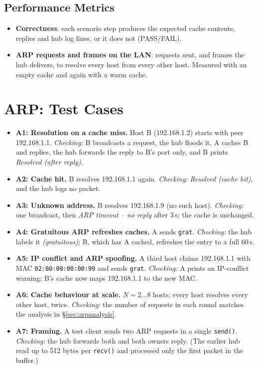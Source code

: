 \documentclass[11pt]{article}
\begin{document}
\subsection{Performance Metrics}
\begin{itemize}[leftmargin=1.6em]
  \item \textbf{Correctness}: each scenario step produces the expected cache contents,
  replies and hub log lines, or it does not (PASS/FAIL).
  \item \textbf{ARP requests and frames on the LAN}: requests sent, and frames the hub
  delivers, to resolve every host from every other host. Measured with an empty cache and
  again with a warm cache.
\end{itemize}


\section{ARP: Test Cases}

\begin{itemize}[leftmargin=1.6em]
  \item \textbf{A1: Resolution on a cache miss.} Host B (192.168.1.2) starts with peer
  192.168.1.1. \emph{Checking:} B broadcasts a request, the hub floods it, A caches B and
  replies, the hub forwards the reply to B's port only, and B prints
  \emph{Resolved (after reply)}.
  \item \textbf{A2: Cache hit.} B resolves 192.168.1.1 again. \emph{Checking:}
  \emph{Resolved (cache hit)}, and the hub logs no packet.
  \item \textbf{A3: Unknown address.} B resolves 192.168.1.9 (no such host).
  \emph{Checking:} one broadcast, then \emph{ARP timeout -- no reply} after 3\,s; the
  cache is unchanged.
  \item \textbf{A4: Gratuitous ARP refreshes caches.} A sends \texttt{grat}.
  \emph{Checking:} the hub labels it \emph{(gratuitous)}; B, which has A cached,
  refreshes the entry to a full 60\,s.
  \item \textbf{A5: IP conflict and ARP spoofing.} A third host claims 192.168.1.1 with MAC
  \texttt{02:00:00:00:00:99} and sends \texttt{grat}. \emph{Checking:} A prints an
  IP-conflict warning; B's cache now maps 192.168.1.1 to the new MAC.
  \item \textbf{A6: Cache behaviour at scale.} $N=2\ldots8$ hosts; every host resolves
  every other host, twice. \emph{Checking:} the number of requests in each round matches
  the analysis in \S\ref{sec:arpanalysis}.
  \item \textbf{A7: Framing.} A test client sends two ARP requests in a single
  \texttt{send()}. \emph{Checking:} the hub forwards both and both owners reply. (The earlier hub read up to 512 bytes per
  \texttt{recv()} and processed only the first packet in the buffer.)
\end{itemize}
\end{document}
